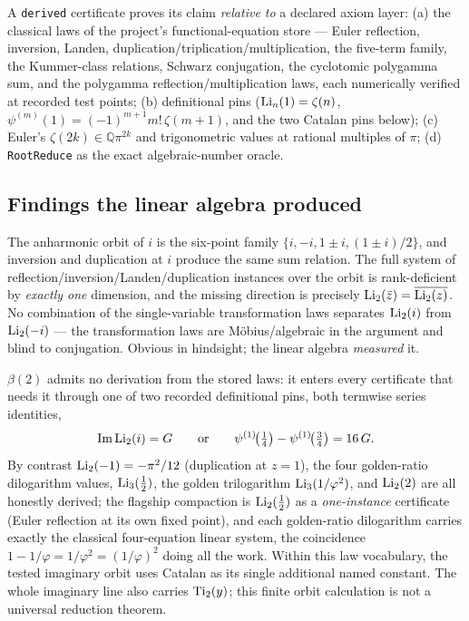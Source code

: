 A \texttt{derived} certificate proves its claim \emph{relative to} a declared axiom
layer: (a) the classical laws of the project's functional-equation store \cite{bridge:Lewin} ---
Euler reflection, inversion, Landen, duplication/triplication/multiplication, the five-term
family, the Kummer-class relations, Schwarz conjugation, the cyclotomic polygamma sum,
and the polygamma reflection/multiplication laws, each numerically verified at recorded
test points; (b) definitional pins ($\operatorname{Li}_n(1)=\zeta(n)$,
$\psi^{(m)}(1)=(-1)^{m+1}m!\,\zeta(m+1)$, and the two Catalan pins below); (c) Euler's
$\zeta(2k)\in\mathbb{Q}\pi^{2k}$ and trigonometric values at rational multiples of $\pi$;
(d) \texttt{RootReduce} as the exact algebraic-number oracle.

\subsection{Findings the linear algebra produced}

\begin{finding}\label{gamma:find:schwarz}
The anharmonic orbit of $i$ is the six-point family $\{i,-i,1\pm i,(1\pm i)/2\}$, and
inversion and duplication at $i$ produce the same sum relation. The full system of
reflection/inversion/Landen/duplication instances over the orbit is rank-deficient by
\emph{exactly one} dimension, and the missing direction is precisely
$\operatorname{Li}_2(\bar z)=\overline{\operatorname{Li}_2(z)}$. No combination of the single-variable transformation
laws separates $\operatorname{Li}_2(i)$ from $\operatorname{Li}_2(-i)$ --- the transformation laws are
M\"obius/algebraic in the argument and blind to conjugation. Obvious in hindsight; the
linear algebra \emph{measured} it.
\end{finding}

\begin{finding}\label{gamma:find:catalan}
$\beta(2)$ admits no derivation from the stored laws: it enters every certificate that
needs it through one of two recorded definitional pins, both termwise series identities,
\[
\operatorname{Im}\operatorname{Li}_2(i)=G
\qquad\text{or}\qquad
\psi^{(1)}\!\bigl(\tfrac14\bigr)-\psi^{(1)}\!\bigl(\tfrac34\bigr)=16\,G .
\]
By contrast $\operatorname{Li}_2(-1)=-\pi^2/12$ (duplication at $z=1$), the four golden-ratio dilogarithm
values, $\operatorname{Li}_3(\tfrac12)$, the golden trilogarithm $\operatorname{Li}_3(1/\varphi^2)$, and $\operatorname{Li}_2(2)$
are all honestly derived; the flagship compaction is $\operatorname{Li}_2(\tfrac12)$ as a
\emph{one-instance} certificate (Euler reflection at its own fixed point), and each
golden-ratio dilogarithm carries exactly the classical four-equation linear system, the
coincidence $1-1/\varphi=1/\varphi^2=(1/\varphi)^2$ doing all the work. Within this law
vocabulary, the tested imaginary orbit uses Catalan as its single additional named constant. The whole imaginary line also carries $\operatorname{Ti}_2(y)$; this finite orbit calculation is not a universal reduction theorem.
\end{finding}

